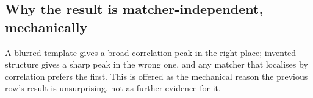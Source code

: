 \subsection{Why the result is matcher-independent, mechanically}

A blurred template gives a broad correlation peak in the right place; invented structure
gives a sharp peak in the wrong one, and any matcher that localises by correlation prefers
the first.
This is offered as the mechanical reason the previous row's result is unsurprising, not
as further evidence for it.

